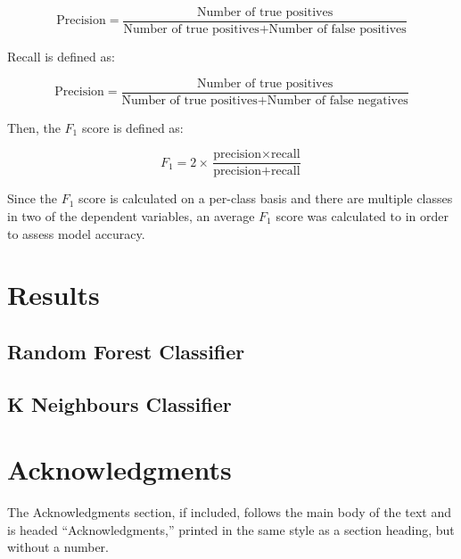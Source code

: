 \documentclass[a4paper,11pt]{article}
\begin{document}
\begin{equation}
	\text{Precision} = \frac{ \text{Number of true positives} }{\text{Number of true positives} + \text{Number of false positives}}
\end{equation}

Recall is defined as:

\begin{equation}
	\text{Precision} = \frac{ \text{Number of true positives} }{\text{Number of true positives} + \text{Number of false negatives}}
\end{equation}

Then, the $F_{1}$ score is defined as:

\begin{equation}
	F_{1} = 2 \times \frac{\text{precision} \times \text{recall}}{\text{precision} + \text{recall}}
\end{equation}

Since the $F_{1}$ score is calculated on a per-class basis and there are multiple classes in two of the dependent variables, an average $F_{1}$ score was calculated to in order to assess model accuracy.

\section{Results}

\subsection{Random Forest Classifier}

\subsection{K Neighbours Classifier}

\section*{Acknowledgments}

The Acknowledgments section, if included,
		       follows the main body of the text and is headed
		       ``Acknowledgments,'' printed in the same style
		       as a section heading, but without a number.




\end{document}

